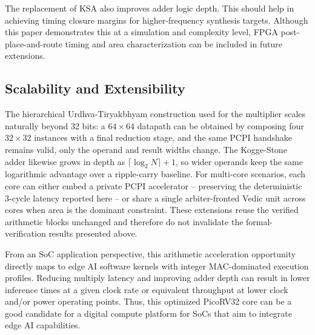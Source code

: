 The replacement of KSA also improves adder logic depth. This should help in achieving timing closure margins for higher-frequency synthesis targets. Although this paper demonstrates this at a simulation and complexity level, FPGA post-place-and-route timing and area characterization can be included in future extensions.



\subsection{Scalability and Extensibility}
The hierarchical Urdhva-Tiryakbhyam construction used for the multiplier scales naturally beyond 32 bits: a $64\times64$ datapath can be obtained by composing four $32\times32$ instances with a final reduction stage, and the same PCPI handshake remains valid, only the operand and result widths change. The Kogge-Stone adder likewise grows in depth as $\lceil \log_2 N\rceil + 1$, so wider operands keep the same logarithmic advantage over a ripple-carry baseline. For multi-core scenarios, each core can either embed a private PCPI accelerator -- preserving the deterministic 3-cycle latency reported here -- or share a single arbiter-fronted Vedic unit across cores when area is the dominant constraint. These extensions reuse the verified arithmetic blocks unchanged and therefore do not invalidate the formal-verification results presented above.

From an SoC application perspective, this arithmetic acceleration opportunity directly maps to edge AI software kernels with integer MAC-dominated execution profiles. Reducing multiply latency and improving adder depth can result in lower inference times at a given clock rate or equivalent throughput at lower clock and/or power operating points. Thus, this optimized PicoRV32 core can be a good candidate for a digital compute platform for SoCs that aim to integrate edge AI capabilities.
